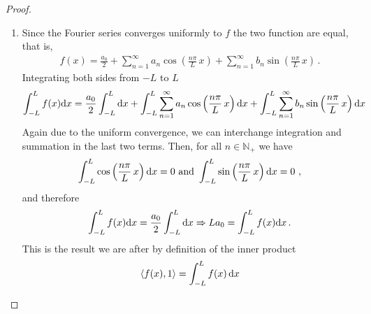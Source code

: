 \begin{proof}
	\begin{enumerate}
		\item Since the Fourier series converges uniformly to $f$ the two function are equal, that
			is,   
			\begin{eqnarray}
				\label{eq:f=F}
				f(x) =  \frac{a_0}{2} + \sum_{n=1}^\infty a_n \cos\left(\frac{n\pi}{L} \, x\right) 
										+ \sum_{n=1}^\infty b_n \sin\left(\frac{n\pi}{L}\, x\right) \, .
			\end{eqnarray}
			Integrating both sides from $-L$ to $L$ 
		\begin{eqnarray}
			 \int_{-L}^{L}f(x) \mathrm{d} x = \frac{a_0}{2} \int_{-L}^L \mathrm{d} x + \int_{-L}^L \sum_{n=1}^\infty a_n 
				\cos\left(\frac{n\pi }{L} \, x\right) \mathrm{d} x + \int_{-L}^L \sum_{n=1}^\infty b_n \sin\left(\frac{n\pi 
				}{L} \, x\right) \mathrm{d} x \nonumber \\
		\end{eqnarray}
		Again due to the uniform convergence, we can interchange integration and summation in the
			last two terms. Then, for all $n \in \mathbb{N}_+$ we have  
		\begin{equation}
			\int_{-L}^L  \cos\left(\frac{n\pi }{L} \, x\right) \d x = 0 \ \text{and} \ 
			\int_{-L}^L  \sin\left(\frac{n\pi }{L} \, x\right) \d x = 0 \ , 
		\end{equation}
		and therefore
		\begin{equation}
			\label{eq:a0}
			 \int_{-L}^L f(x) \mathrm{d} x = \frac{a_0}{2}   \int_{-L}^L \mathrm{d} x
			 \Rightarrow L a_0 = \int_{-L}^L f(x) \mathrm{d} x \, . 
		\end{equation}
		This is the result we are after  by definition of the inner product
			\begin{equation}
				\langle f(x), 1 \rangle = \int_{-L}^L f(x) \, \mathrm{d} x 
			\end{equation}
		

\end{enumerate}
\end{proof}
